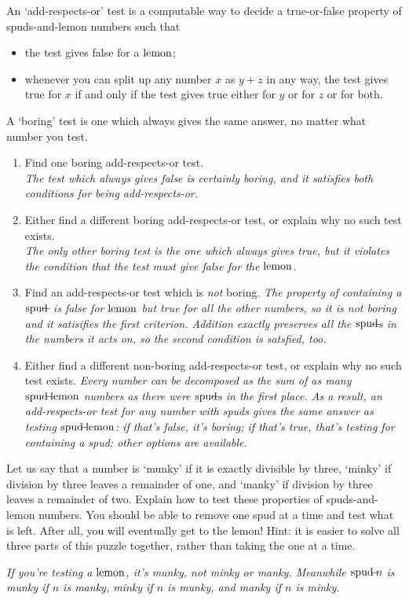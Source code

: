 \documentclass{book}
\begin{document}
\begin{sol}
  An `add-respects-or' test is a computable way to decide a true-or-false property of spuds-and-lemon numbers such that
  \begin{itemize}
  \item the test gives false for a $\mbox{lemon}$;
    \item whenever you can split up any number $x$ as $y+z$ in any way, the test gives true for $x$ if and only if the test gives true either for $y$ or for $z$ or for both.
  \end{itemize}
  A `boring' test is one which always gives the same answer, no matter what number you test.
  \begin{enumerate}
  \item Find one boring add-respects-or test.\\
    \emph{The test which always gives false is certainly boring, and it satisfies both conditions for being add-respects-or.}
  \item Either find a different boring add-respects-or test, or explain why no such test exists.\\
    \emph{The only other boring test is the one which always gives true, but it violates the condition that the test must give false for the $\mbox{lemon}$.}
  \item Find an add-respects-or test which is \emph{not} boring.
    \emph{The property of containing a $\mbox{spud}\!\!\!-\!\!\!\;$ is false for $\mbox{lemon}$ but true for all the other numbers, so it is not boring and it satisifies the first criterion. Addition exactly preserves all the $\mbox{spud}\!\!\!-\!\!\!\,$s in the numbers it acts on, so the second condition is satsfied, too.}
  \item Either find a different non-boring add-respects-or test, or explain why no such test exists.   \emph{Every number can be decomposed as the sum of as many $\mbox{spud}\!\!\!-\!\!\!\mbox{lemon}$ numbers as there were $\mbox{spud}\!\!\!-\!\!\!\,$s in the first place. As a result, an add-respects-or test for any number with spuds gives the same answer as testing $\mbox{spud}\!\!\!-\!\!\!\mbox{lemon}$: if that's false, it's boring; if that's true, that's testing for containing a spud; other options are available. }
  \end{enumerate}
\end{sol}

\begin{sol}
  Let us say that a number is `munky' if it is exactly divisible by three, `minky' if division by three leaves a remainder of one, and `manky' if division by three leaves a remainder of two. Explain how to test these properties of spuds-and-lemon numbers. You should be able to remove one spud at a time and test what is left. After all, you will eventually get to the lemon! Hint: it is easier to solve all three parts of this puzzle together, rather than taking the one at a time.

  \emph{If you're testing a $\mbox{lemon}$, it's munky, not minky or manky. Meanwhile $\mbox{spud}\!\!\!-\!\!\! n$ is munky if $n$ is manky, minky if $n$ is munky, and manky if $n$ is minky.}
\end{sol}
\end{document}
